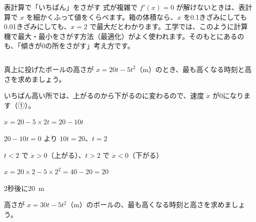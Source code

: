 \begin{kotoba}
\small
{}
\end{kotoba}

\begin{column}{表計算で「いちばん」をさがす}
式が複雑で $f'(x)=0$ が解けないときは、表計算で $x$ を細かくふって値をくらべます。箱の体積なら、$x$ を0.1きざみにしても0.01きざみにしても、$x=2$ で最大だとわかります。工学では、このように計算機で最大・最小をさがす方法（最適化）がよく使われます。そのもとにあるのも、「傾きが0の所をさがす」考え方です。
\end{column}


\begin{reidai}[いちばん高い所]
真上に投げたボールの高さが $x=20t-5t^2$（m）のとき、最も高くなる時刻と高さを求めましょう。\par
\kangaekata いちばん高い所では、上がるのから下がるのに変わるので、速度 $\dot{x}$ が0になります（①）。\par
\shiki $\dot{x}=20-5\times2t=20-10t$\par
\hspace*{2.6\zw}$20-10t=0$ より $10t=20$、$t=2$\par
\hspace*{2.6\zw}$t<2$ で $\dot{x}>0$（上がる）、$t>2$ で $\dot{x}<0$（下がる）\par
\hspace*{2.6\zw}$x=20\times2-5\times2^2=40-20=20$\par
\kotae 2秒後に\qty{20}{m}
\end{reidai}

\begin{jibun}
高さが $x=30t-5t^2$（m）のボールの、最も高くなる時刻と高さを求めましょう。
\end{jibun}

